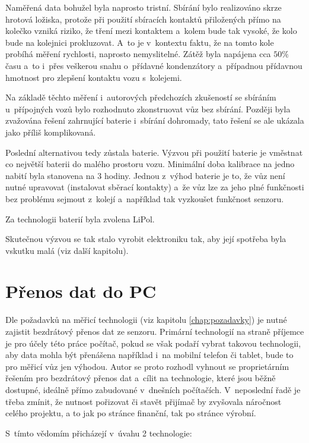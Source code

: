 Naměřená data bohužel byla naprosto tristní. Sbírání bylo realizováno skrze
hrotová ložiska, protože při použití sbíracích kontaktů přiložených přímo na
kolečko vzniká riziko, že tření mezi kontaktem a~kolem bude tak vysoké, že kolo
bude na kolejnici prokluzovat. A~to je v~kontextu faktu, že na tomto kole
probíhá měření rychlosti, naprosto nemyslitelné. Zátěž byla napájena cca $50 \%$
času a~to i~přes veškerou snahu o~přídavné kondenzátory a~případnou přídavnou
hmotnost pro zlepšení kontaktu vozu s~kolejemi.

Na základě těchto měření i~autorových předchozích zkušeností se sbíráním
u~přípojných vozů bylo rozhodnuto zkonstruovat vůz bez sbírání. Později byla
zvažována řešení zahrnující baterie i~sbírání dohromady, tato řešení se ale
ukázala jako příliš komplikovaná.

Poslední alternativou tedy zůstala baterie. Výzvou při použití baterie je
vměstnat co největší baterii do malého prostoru vozu. Minimální doba kalibrace
na jedno nabití byla stanovena na 3 hodiny. Jednou z~výhod baterie je to, že
vůz není nutné upravovat (instalovat sběrací kontakty) a~že vůz lze za jeho
plné funkčnosti bez problému sejmout z~kolejí a~například tak vyzkoušet
funkčnost senzoru.

Za technologii baterií byla zvolena LiPol.

Skutečnou výzvou se tak stalo vyrobit elektroniku tak, aby její spotřeba byla
vskutku malá (viz další kapitolu).

\section{Přenos dat do PC}
\label{sec:wsm-prenos-pc}

Dle požadavků na měřicí technologii (viz kapitolu \ref{chap:pozadavky}) je
nutné zajistit bezdrátový přenos dat ze senzoru. Primární technologií na straně
příjemce je pro účely této práce počítač, pokud se však podaří vybrat takovou
technologii, aby data mohla být přenášena například i~na mobilní telefon či
tablet, bude to pro měřicí vůz jen výhodou. Autor se proto rozhodl vyhnout se
proprietárním řešením pro bezdrátový přenos dat a~cílit na technologie, které
jsou běžně dostupné, ideálně přímo zabudované v~dnešních počítačích.
V~neposlední řadě je třeba zmínit, že nutnost pořizovat či stavět přijímač by
zvyšovala náročnost celého projektu, a to jak po stránce finanční, tak po
stránce výrobní.

S~tímto vědomím přicházejí v~úvahu 2 technologie:

